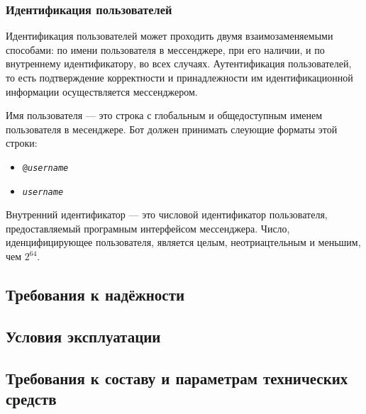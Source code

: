     \subsubsection{Идентификация пользователей}
        \label{sec:req:sec:id}
        Идентификация пользователей может проходить двумя взаимозаменяемыми способами:
        по имени пользователя в мессенджере, при его наличии, и по внутреннему идентификатору,
        во всех случаях. Аутентификация пользователей, то есть подтверждение корректности и
        принадлежности им идентификационной информации осуществляется мессенджером.

        Имя пользователя --- это строка с глобальным и общедоступным именем пользователя в месенджере.
        Бот должен принимать слеующие форматы этой строки:
        \begin{itemize}
            \item
                \texttt{@\textit{username}}
            \item
                \texttt{\textit{username}}
        \end{itemize}
        
        Внутренний идентификатор --- это числовой идентификатор пользователя, предоставляемый
        програмным интерфейсом мессенджера. Число, иденцифицирующее пользователя, является целым,
        неотриацтельным и меньшим, чем \(2^{64}\).

\subsection{Требования к надёжности}
    \label{sec:req:reliab}

\subsection{Условия эксплуатации}
    \label{sec:req:maint}

\subsection{Требования к составу и параметрам технических средств}
    \label{sec:req:hw}

